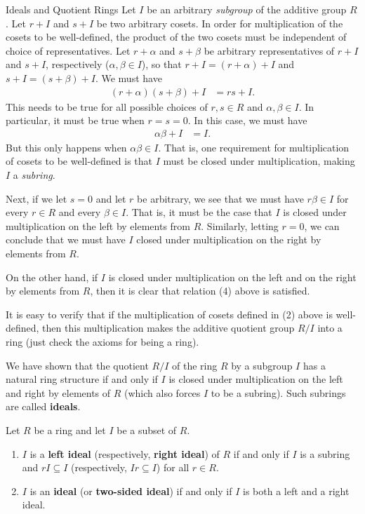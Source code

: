 \begin{section}{Ideals and Quotient Rings}
Let $I$ be an arbitrary \emph{subgroup} of the additive group $R$.  Let $r+I$ and $s+I$ be two arbitrary cosets.  In order for multiplication of the cosets to be well-defined, the product of the two cosets must be independent of choice of representatives.  Let $r+\alpha$ and $s+\beta$ be arbitrary representatives of $r+I$ and $s+I$, respectively ($\alpha,\beta\in I$), so that $r+I=(r+\alpha)+I$ and $s+I=(s+\beta)+I$.  We must have
\begin{align}
(r+\alpha)(s+\beta)+I & =rs+I.
\end{align}
This needs to be true for all possible choices of $r,s\in R$ and $\alpha, \beta\in I$.  In particular, it must be true when $r=s=0$.  In this case, we must have
\begin{align}
\alpha\beta+I & =I.
\end{align}
But this only happens when $\alpha\beta\in I$.  That is, one requirement for multiplication of cosets to be well-defined is that $I$ must be closed under multiplication, making $I$ a \emph{subring}.

Next, if we let $s=0$ and let $r$ be arbitrary, we see that we must have $r\beta\in I$ for every $r\in R$ and every $\beta\in I$.  That is, it must be the case that $I$ is closed under multiplication on the left by elements from $R$.  Similarly, letting $r=0$, we can conclude that we must have $I$ closed under multiplication on the right by elements from $R$.  

On the other hand, if $I$ is closed under multiplication on the left and on the right by elements from $R$, then it is clear that relation (4) above is satisfied.

It is easy to verify that if the multiplication of cosets defined in (2) above is well-defined, then this multiplication makes the additive quotient group $R/I$ into a ring (just check the axioms for being a ring).

We have shown that the quotient $R/I$ of the ring $R$ by a subgroup $I$ has a natural ring structure if and only if $I$ is closed under multiplication on the left and right by elements of $R$ (which also forces $I$ to be a subring).  Such subrings are called \textbf{ideals}.

\begin{definition}
Let $R$ be a ring and let $I$ be a subset of $R$.
\begin{enumerate}[label=\rm{(\alph*)}]
\item $I$ is a \textbf{left ideal} (respectively, \textbf{right ideal}) of $R$ if and only if $I$ is a subring and $rI\subseteq I$ (respectively, $Ir\subseteq I$) for all $r\in R$.
\item $I$ is an \textbf{ideal} (or \textbf{two-sided ideal}) if and only if $I$ is both a left and a right ideal.
\end{enumerate}
\end{definition}


\end{section}
